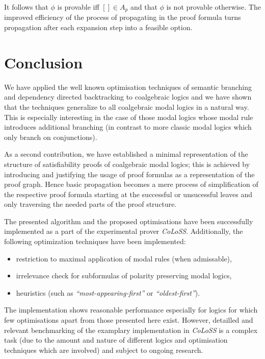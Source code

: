\documentclass{llncs}
\begin{document}
It follows that $\phi$ is provable iff $[]\in A_p$ and that $\phi$ is not provable otherwise. The
improved efficiency of the process of propagating in the proof formula turns propagation after
each expansion step into a feasible option.

\section{Conclusion}  

We have applied the well known optimisation techniques of semantic branching and dependency directed
backtracking to coalgebraic logics and we have shown that the techniques generalize to all coalgebraic
modal logics in a natural way. This is especially interesting in the case of those modal logics
whose modal rule introduces additional branching (in contrast to more classic modal logics which only
branch on conjunctions).

As a second contribution, we have established a minimal representation of the structure of satisfiability
proofs of coalgebraic modal logics; this is achieved by introducing and justifying the usage of proof formulas
as a representation of the proof graph. Hence basic propagation becomes
a mere process of simplification of the respective proof formula starting at the successful or unsucessful
leaves and only traversing the needed parts of the proof structure.

The presented algorithm and the proposed optimisations have been successfully implemented as a part of the
experimental prover \emph{CoLoSS}. Additionally, the following optimization techniques have been implemented:
\begin{itemize}
\item restriction to maximal application of modal rules (when admissable),
\item irrelevance check for subformulas of polarity preserving modal logics,
\item heuristics (such as \emph{``most-appearing-first''} or \emph{``oldest-first''}).
\end{itemize}

The implementation shows reasonable performance especially for logics for
which few optimisations apart from those presented here exist.
However, detailled and relevant benchmarking of the examplary implementation in \emph{CoLoSS} is a complex task
(due to the amount and nature of different logics and optimisation techniques which are involved)
and subject to ongoing research.



\end{document}
